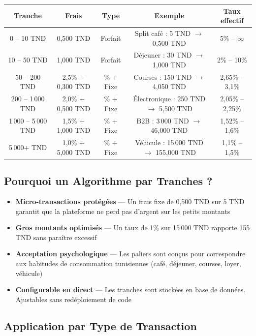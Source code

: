 \documentclass[11pt,a4paper]{article}
\begin{document}
\begin{center}
\begin{tabular}{|c|c|c|c|c|}
\hline
\textbf{Tranche} & \textbf{Frais} & \textbf{Type} & \textbf{Exemple} & \textbf{Taux effectif} \\
\hline
0 -- 10 TND   & 0,500 TND & Forfait & Split caf\'e : 5 TND $\rightarrow$ 0,500 TND & 5\% -- $\infty$ \\
10 -- 50 TND  & 1,000 TND & Forfait & D\'ejeuner : 30 TND $\rightarrow$ 1,000 TND & 2\% -- 10\% \\
50 -- 200 TND & 2,5\% + 0,300 TND & \% + Fixe & Courses : 150 TND $\rightarrow$ 4,050 TND & 2,65\% -- 3,1\% \\
200 -- 1\,000 TND & 2,0\% + 0,500 TND & \% + Fixe & \'Electronique : 250 TND $\rightarrow$ 5,500 TND & 2,05\% -- 2,25\% \\
1\,000 -- 5\,000 TND & 1,5\% + 1,000 TND & \% + Fixe & B2B : 3\,000 TND $\rightarrow$ 46,000 TND & 1,52\% -- 1,6\% \\
5\,000+ TND & 1,0\% + 5,000 TND & \% + Fixe & V\'ehicule : 15\,000 TND $\rightarrow$ 155,000 TND & 1,1\% -- 1,5\% \\
\hline
\end{tabular}
\end{center}

\subsection{Pourquoi un Algorithme par Tranches ?}

\begin{itemize}[leftmargin=*]
    \item \textbf{Micro-transactions prot\'eg\'ees} --- Un frais fixe de 0,500 TND sur 5 TND garantit que la plateforme ne perd pas d'argent sur les petits montants
    \item \textbf{Gros montants optimis\'es} --- Un taux de 1\% sur 15\,000 TND rapporte 155 TND sans para\^itre excessif
    \item \textbf{Acceptation psychologique} --- Les paliers sont con\c{c}us pour correspondre aux habitudes de consommation tunisiennes (caf\'e, d\'ejeuner, courses, loyer, v\'ehicule)
    \item \textbf{Configurable en direct} --- Les tranches sont stock\'ees en base de donn\'ees. Ajustables sans red\'eploiement de code
\end{itemize}

\subsection{Application par Type de Transaction}
\end{document}
